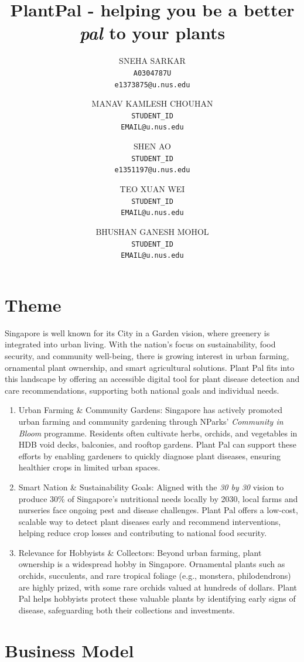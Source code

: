 \documentclass[11pt]{article}
\title{PlantPal - helping you be a better \textit{pal} to your plants
}
\author{
    \begin{tabular}[t]{l}
        SNEHA SARKAR \\
        \texttt{A0304787U} \\
        \texttt{e1373875@u.nus.edu} \\
    \end{tabular}
    \and
    \begin{tabular}[t]{l}
        MANAV KAMLESH CHOUHAN \\
        \texttt{STUDENT\_ID} \\
        \texttt{EMAIL@u.nus.edu} \\
    \end{tabular}
    \and
    \begin{tabular}[t]{l}
        SHEN AO \\
        \texttt{STUDENT\_ID} \\
        \texttt{e1351197@u.nus.edu} \\
    \end{tabular}
    \and
    \begin{tabular}[t]{l}
        TEO XUAN WEI \\
        \texttt{STUDENT\_ID} \\
        \texttt{EMAIL@u.nus.edu} \\
    \end{tabular}
    \and
    \begin{tabular}[t]{l}
        BHUSHAN GANESH MOHOL \\
        \texttt{STUDENT\_ID} \\
        \texttt{EMAIL@u.nus.edu}
    \end{tabular}
}
\begin{document}
\maketitle

\section{Theme}
Singapore is well known for its City in a Garden vision, where greenery is integrated into urban living. With the nation’s focus on sustainability, food security, and community well-being, there is growing interest in urban farming, ornamental plant ownership, and smart agricultural solutions. Plant Pal fits into this landscape by offering an accessible digital tool for plant disease detection and care recommendations, supporting both national goals and individual needs.

\begin{enumerate}
    \item Urban Farming \& Community Gardens: Singapore has actively promoted urban farming and community gardening through NParks’ \textit{Community in Bloom} programme. Residents often cultivate herbs, orchids, and vegetables in HDB void decks, balconies, and rooftop gardens. Plant Pal can support these efforts by enabling gardeners to quickly diagnose plant diseases, ensuring healthier crops in limited urban spaces.

    \item Smart Nation \& Sustainability Goals: Aligned with the \textit{30 by 30} vision to produce 30\% of Singapore’s nutritional needs locally by 2030, local farms and nurseries face ongoing pest and disease challenges. Plant Pal offers a low-cost, scalable way to detect plant diseases early and recommend interventions, helping reduce crop losses and contributing to national food security.

    \item Relevance for Hobbyists \& Collectors: Beyond urban farming, plant ownership is a widespread hobby in Singapore. Ornamental plants such as orchids, succulents, and rare tropical foliage (e.g., monstera, philodendrons) are highly prized, with some rare orchids valued at hundreds of dollars. Plant Pal helps hobbyists protect these valuable plants by identifying early signs of disease, safeguarding both their collections and investments.
\end{enumerate}


\section{Business Model}
\end{document}
